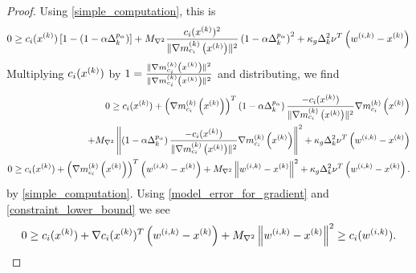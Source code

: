 \begin{proof}
Using \cref{simple_computation}, this is
\begin{align*}
0 \ge c_i(x^{(k)})\left[1 - \left(1 - \alpha \Delta_k^{p_{\alpha}}\right)\right] + {M_{\nabla^2}} \frac {c_i(x^{(k)})^2}{\|{\nabla m_{c_i}^{(k)}\left(x^{(k)}\right)}\|^2}\left(1 - \alpha \Delta_k^{p_{\alpha}}\right)^2 + \kappa_g \Delta_k^2\nu^T \left({w^{(i, k)}} - x^{(k)}\right)
\end{align*}
Multiplying $c_i(x^{(k)})$ by $1 = \frac{\|{\nabla m_{c_i}^{(k)}\left(x^{(k)}\right)}\|^2}{\|{\nabla m_{c_i}^{(k)}\left(x^{(k)}\right)}\|^2}$ and distributing, we find
\begin{align*}
0 \ge c_i(x^{(k)}) + \left({\nabla m_{c_i}^{(k)}\left(x^{(k)}\right)}\right)^T\left(1 - \alpha \Delta_k^{p_{\alpha}}\right)\frac{-c_i(x^{(k)})}{\|{\nabla m_{c_i}^{(k)}\left(x^{(k)}\right)}\|^2}{\nabla m_{c_i}^{(k)}\left(x^{(k)}\right)}  \\
+ {M_{\nabla^2}} \left\|\left(1 - \alpha \Delta_k^{p_{\alpha}}\right)\frac{-c_i(x^{(k)})}{\|{\nabla m_{c_i}^{(k)}\left(x^{(k)}\right)}\|^2}{\nabla m_{c_i}^{(k)}\left(x^{(k)}\right)}\right\|^2
+ \kappa_g \Delta_k^2\nu^T \left({w^{(i, k)}} - x^{(k)}\right) \\
0 \ge c_i(x^{(k)}) + \left({\nabla m_{c_i}^{(k)}\left(x^{(k)}\right)}\right)^T\left({w^{(i, k)}} - x^{(k)}\right)+ {M_{\nabla^2}} \left\|{w^{(i, k)}} - x^{(k)}\right\|^2  + \kappa_g \Delta_k^2\nu^T \left({w^{(i, k)}} - x^{(k)}\right).
\end{align*}
by \cref{simple_computation}.
Using \cref{model_error_for_gradient} and \cref{constraint_lower_bound} we see
\begin{align}
0 \ge c_i(x^{(k)}) + \nabla c_i(x^{(k)})^T\left({w^{(i, k)}} - x^{(k)} \right) + {M_{\nabla^2}} \left\|{w^{(i, k)}} - x^{(k)}\right\|^2 \ge c_i({w^{(i, k)}}). \label{c_is_negative}
\end{align}


\end{proof}
